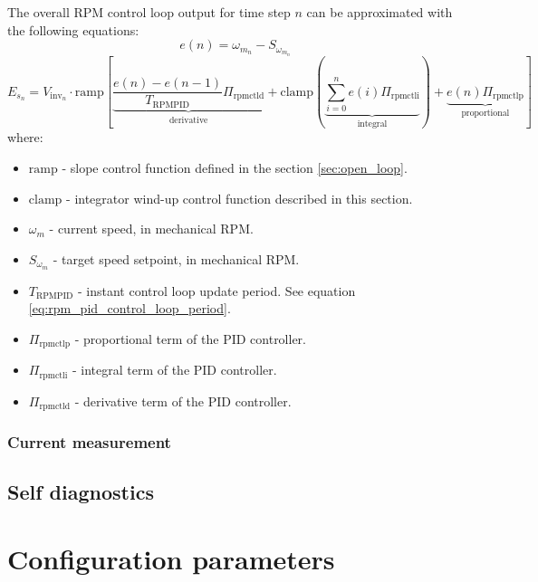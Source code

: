 \documentclass{zubaxdoc}
\begin{document}
The overall RPM control loop output for time step $n$ can be approximated with the following equations:
\begin{equation}
e(n) = \omega_{m_{n}} - S_{\omega_{m_{n}}}
\end{equation}
\begin{equation}
E_{s_n} = V_{\text{inv}_n}\cdot\mathrm{ramp}
\left[
\underbrace{\frac{e\left(n\right) - e\left(n-1\right)}{T_{\text{RPMPID}}} \Pi_{\text{rpmctld}}}_\text{derivative} +
\mathrm{clamp}\left(\underbrace{\sum_{i=0}^n e\left(i\right) \Pi_{\text{rpmctli}}}_\text{integral}\right) +
\underbrace{e\left(n\right) \Pi_{\text{rpmctlp}}}_\text{proportional}
\right]
\end{equation}
where:
\begin{itemize}
\item $\mathrm{ramp}$ - slope control function defined in the section \ref{sec:open_loop}.
\item $\mathrm{clamp}$ - integrator wind-up control function described in this section.
\item $\omega_{m}$ - current speed, in mechanical RPM.
\item $S_{\omega_{m}}$ - target speed setpoint, in mechanical RPM.
\item $T_{\text{RPMPID}}$ - instant control loop update period.
See equation \ref{eq:rpm_pid_control_loop_period}.
\item $\Pi_{\text{rpmctlp}}$ - proportional term of the PID controller.
\item $\Pi_{\text{rpmctli}}$ - integral term of the PID controller.
\item $\Pi_{\text{rpmctld}}$ - derivative term of the PID controller.
\end{itemize}

\subsection{Current measurement}



\section{Self diagnostics}



\chapter{Configuration parameters}
\end{document}
